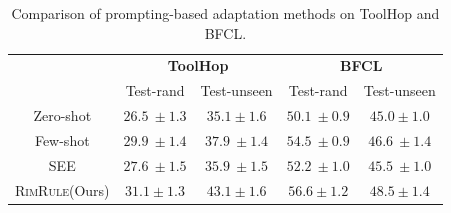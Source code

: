 \documentclass[11pt]{article}
\newcommand{\shortname}{\textsc{RimRule}\xspace}
\begin{document}


\begin{table}[t]
\small
\caption{Comparison of prompting-based adaptation methods on ToolHop and BFCL.}

\vspace{0.4em}
\label{tab:vs_prompt}
\centering
\setlength{\tabcolsep}{8pt}
\renewcommand{\arraystretch}{1.12}
\begin{tabular}{@{}c|cc|cc@{}}


\toprule 
& \multicolumn{2}{c|}{\textbf{ToolHop}} & \multicolumn{2}{c}{\textbf{BFCL}} 
\\ %
& Test-rand & Test-unseen & Test-rand & Test-unseen \\ 
\midrule


Zero-shot            
& $26.5 \scriptstyle ~\pm 1.3$ & $35.1 \scriptstyle \pm 1.6$  
& $50.1 \scriptstyle ~\pm 0.9$ & $45.0 \scriptstyle \pm 1.0$ 
 \\

Few-shot \citep{yizhe2021fewshot}           
& $29.9 \scriptstyle ~\pm 1.4$ & $37.9 \scriptstyle ~\pm 1.4$  
& $54.5 \scriptstyle ~\pm 0.9$ & $46.6 \scriptstyle ~\pm 1.4$ 
 \\

SEE \citep{cui2025see} 
& $27.6 \scriptstyle ~\pm 1.5$ & $35.9 \scriptstyle ~\pm 1.5$    
& $52.2 \scriptstyle ~\pm 1.0$ & $45.5 \scriptstyle ~\pm 1.0$ 
 \\

\shortname (Ours)  
& $\mathbf{31.1} \scriptstyle \pm 1.3$ & $\mathbf{43.1} \scriptstyle \pm 1.6$ 
& $\mathbf{56.6} \scriptstyle \pm 1.2$ & $\mathbf{48.5} \scriptstyle \pm 1.4$
 \\

\bottomrule
\end{tabular}
\end{table}

\end{document}
